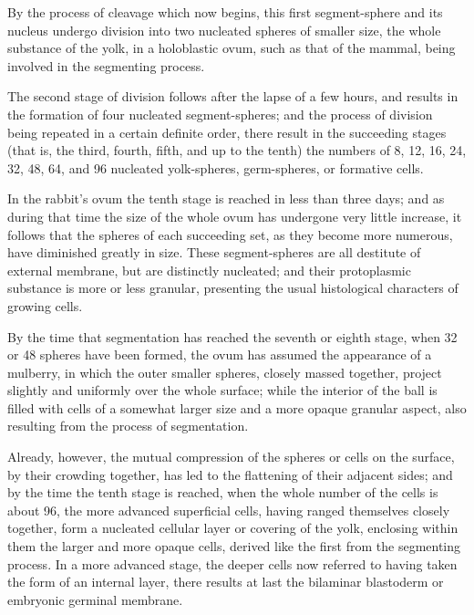 \documentclass[a4paper, 11pt, oneside, english]{article}
\begin{document}
By the process of cleavage which now begins, this first segment-sphere and its nucleus undergo division into two nucleated spheres of smaller size, the whole substance of the yolk, in a holoblastic ovum, such as that of the mammal, being involved in the segmenting process.

The second stage of division follows after the lapse of a few hours, and results in the formation of four nucleated segment-spheres; and the process of division being repeated in a certain definite order, there result in the succeeding stages (that is, the third, fourth, fifth, and up to the tenth) the numbers of 8, 12, 16, 24, 32, 48, 64, and 96 nucleated yolk-spheres, germ-spheres, or formative cells.

In the rabbit's ovum the tenth stage is reached in less than three days; and as during that time the size of the whole ovum has undergone very little increase, it follows that the spheres of each succeeding set, as they become more numerous, have diminished greatly in size. These segment-spheres are all destitute of external membrane, but are distinctly nucleated; and their protoplasmic substance is more or less granular, presenting the usual histological characters of growing cells.

By the time that segmentation has reached the seventh or eighth stage, when 32 or 48 spheres have been formed, the ovum has assumed the appearance of a mulberry, in which the outer smaller spheres, closely massed together, project slightly and uniformly over the whole surface; while the interior of the ball is filled with cells of a somewhat larger size and a more opaque granular aspect, also resulting from the process of segmentation.

Already, however, the mutual compression of the spheres or cells on the surface, by their crowding together, has led to the flattening of their adjacent sides; and by the time the tenth stage is reached, when the whole number of the cells is about 96, the more advanced superficial cells, having ranged themselves closely together, form a nucleated cellular layer or covering of the yolk, enclosing within them the larger and more opaque cells, derived like the first from the segmenting process. In a more advanced stage, the deeper cells now referred to having taken the form of an internal layer, there results at last the bilaminar blastoderm or embryonic germinal membrane.
\end{document}
